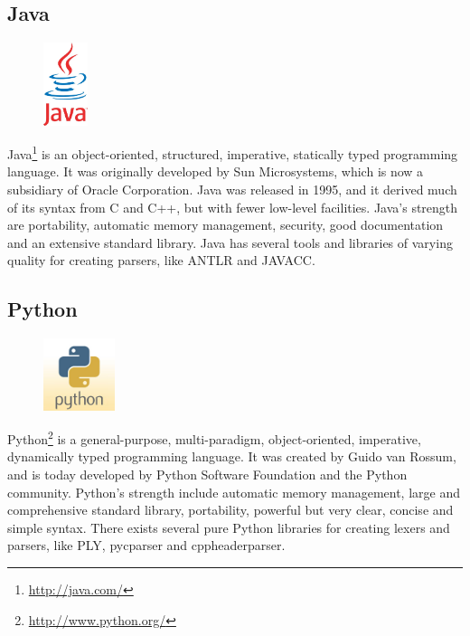 \subsection{Java}
\begin{figure}
	\begin{center}
	\vspace{-30pt}
		\includegraphics[width=1.3cm]{./planning/img/java_logo}
	\vspace{-30pt}
	\end{center}
\end{figure}
Java\footnote{\url{http://java.com/}} is an object-oriented, structured,
imperative, statically typed
programming language. It was originally developed by Sun Microsystems, which
is now a subsidiary of Oracle Corporation. Java was released in 1995, and it
derived much of its syntax from C and C++, but with fewer low-level facilities.
Java’s strength are portability, automatic memory management, security, good
documentation and an extensive standard library. Java has several tools and
libraries of varying quality for creating parsers, like ANTLR and JAVACC.

\subsection{Python}
\begin{figure}
	\begin{center}
	\vspace{-30pt}
		\includegraphics[width=2.1cm]{./planning/img/python_logo}
	\vspace{-30pt}
	\end{center}
\end{figure}
Python\footnote{\url{http://www.python.org/}} is a general-purpose,
multi-paradigm, object-oriented, imperative,
dynamically typed programming language. It was created by Guido van Rossum,
and is today developed by Python Software Foundation and the Python community.
Python’s strength include automatic memory management, large and comprehensive
standard library, portability, powerful but very clear, concise and simple
syntax. There exists several pure Python libraries for creating lexers and
parsers, like PLY, pycparser and cppheaderparser.


